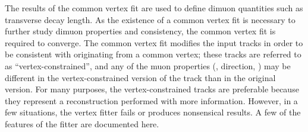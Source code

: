 The results of the common vertex fit are used to define dimuon quantities such as transverse decay length.
As the existence of a common vertex fit is necessary to further study dimuon properties and consistency, the common vertex fit is required to converge.
The common vertex fit modifies the input tracks in order to be consistent with originating from a common vertex; these tracks are referred to as ``vertex-constrained'', and any of the muon properties (\pT, direction, \etc) may be different in the vertex-constrained version of the track than in the original version.
For many purposes, the vertex-constrained tracks are preferable because they represent a reconstruction performed with more information.
However, in a few situations, the vertex fitter fails or produces nonsensical results.
A few of the features of the fitter are documented here.

